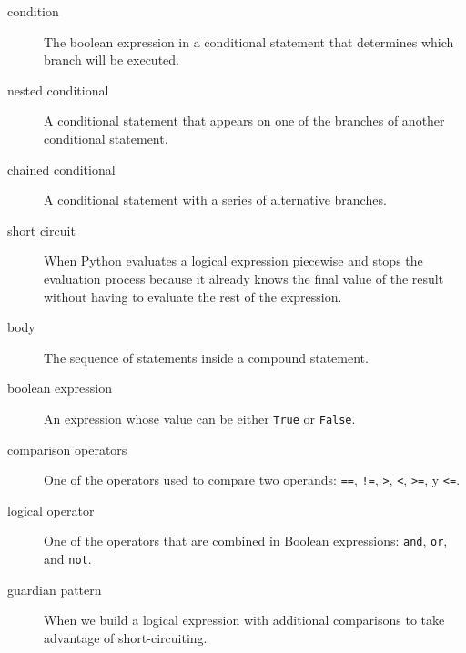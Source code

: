 \begin{description}
\item[condition]
The boolean expression in a conditional statement that determines which branch will be executed.
\end{description}


\begin{description}
\item[nested conditional]
A conditional statement that appears on one of the branches of another conditional statement.
\end{description}

 

\begin{description}
\item[chained conditional]
A conditional statement with a series of alternative branches.
\end{description}

 

\begin{description}
\item[short circuit]
When Python evaluates a logical expression piecewise and stops the evaluation process because it already knows the final value of the result without having to evaluate the rest of the expression.
\end{description}


\begin{description}
\item[body]
The sequence of statements inside a compound statement.
\end{description}


\begin{description}
\item[boolean expression]
An expression whose value can be either \texttt{True} or \texttt{False}.
\end{description}

 

\begin{description}
\item[comparison operators]
One of the operators used to compare two operands:
\texttt{==}, \texttt{!=}, \texttt{\textgreater{}}, \texttt{\textless{}},
\texttt{\textgreater{}=}, y \texttt{\textless{}=}.
\item[logical operator]
One of the operators that are combined in Boolean expressions:
\texttt{and}, \texttt{or}, and \texttt{not}.
\item[guardian pattern]
When we build a logical expression with additional comparisons to take advantage of short-circuiting.
\end{description}

